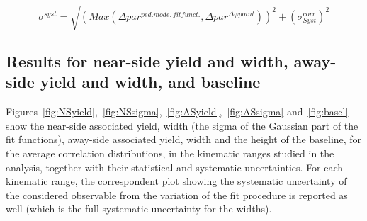 \begin{itemize}
\end{itemize}

\begin{equation}
\sigma^{syst} = \sqrt{\left(Max\left(\Delta par^{ped.mode,fit funct.},\Delta par^{\Delta\varphi point}\right)\right)^{2} + (\sigma_{Syst}^{corr})^{2}}
\end{equation}

\subsection{Results for near-side yield and width, away-side yield and width, and baseline}
Figures~\ref{fig:NSyield},~\ref{fig:NSsigma},~\ref{fig:ASyield},~\ref{fig:ASsigma} and~\ref{fig:basel} show the near-side associated yield, width (the sigma of the Gaussian part of the fit functions), away-side associated yield, width and the height of the baseline, for the average correlation distributions, in the kinematic ranges studied in the analysis, together with their statistical and systematic uncertainties. For each kinematic range, the correspondent plot showing the systematic uncertainty of the considered observable from the variation of the fit procedure is reported as well (which is the full systematic uncertainty for the widths).

